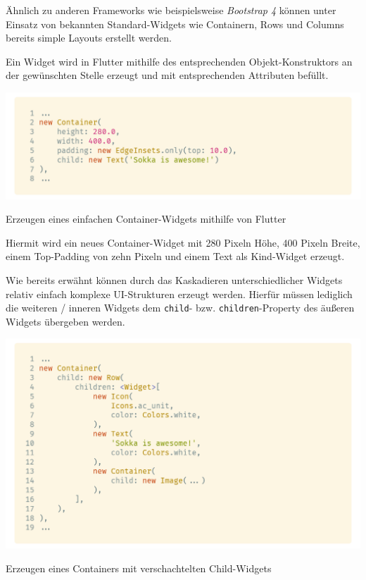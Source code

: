 Ähnlich zu anderen Frameworks wie beispielsweise \textit{Bootstrap 4} können unter Einsatz von bekannten Standard-Widgets wie Containern, Rows und Columns bereits simple Layouts erstellt werden.

\newpage

Ein Widget wird in Flutter mithilfe des entsprechenden Objekt-Konstruktors an der gewünschten Stelle erzeugt und mit entsprechenden Attributen befüllt.

\begin{code}
    \centering
    \includegraphics[width=1\textwidth]{images/Flutter/flutterCreateContainer.png}
    \caption{Erzeugen eines einfachen Container-Widgets mithilfe von Flutter}
\end{code}

Hiermit wird ein neues Container-Widget mit 280 Pixeln Höhe,
400 Pixeln Breite, einem Top-Padding von zehn Pixeln und einem Text als Kind-Widget erzeugt.

Wie bereits erwähnt können durch das Kaskadieren unterschiedlicher Widgets relativ einfach komplexe UI-Strukturen erzeugt werden. Hierfür müssen lediglich die weiteren / inneren Widgets dem \lstinline{child}- bzw. \lstinline{children}-Property des äußeren Widgets übergeben werden.

\begin{code}
    \centering
    \includegraphics[width=1\textwidth]{images/Flutter/flutterCreateCascadingContainer.png}
    \caption{Erzeugen eines Containers mit verschachtelten Child-Widgets}
\end{code}

